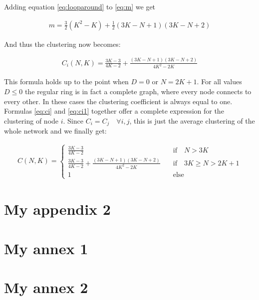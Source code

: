 \begin{apendicesenv}
Adding equation \ref{eq:looparound} to \ref{eq:m} we get

\begin{align}
    m = \frac{3}{2}(K^2 - K) + \frac{1}{2}(3K-N+1)(3K-N+2)
\end{align}

And thus the clustering now becomes:

\begin{align}
    C_i(N,K) = \frac{3K-3}{4K-2} + \frac{(3K-N+1)(3K-N+2)}{4K^2-2K}
    \label{eq:ci1}
\end{align}

This formula holds up to the point when $D=0$ or $N=2K+1$. For all values $D\leq 0$ the regular ring is in fact a complete graph, where
every node connects to every other. In these cases the clustering coefficient is always equal to one.  Formulas \ref{eq:ci} and
\ref{eq:ci1} together offer a complete expression for the clustering of node $i$. Since $C_i=C_j \quad \forall i,j$, this is just the
average clustering of the whole network and we finally get:

\begin{align}
    C(N,K) =
    \begin{cases}
        \frac{3K-3}{4K-2} \quad &\text{if} \quad N>3K \\[9pt]
        \frac{3K-3}{4K-2} + \frac{(3K-N+1)(3K-N+2)}{4K^2-2K} \quad &\text{if}
        \quad 3K \geq N > 2K+1 \\[9pt]
        1 \quad &\text{else}
    \end{cases}
    \label{eq:ci2}
\end{align}


\chapter{My appendix 2}


\end{apendicesenv}


\begin{anexosenv}


\partanexos  %

\chapter{My annex 1}
\chapter{My annex 2}


\end{anexosenv}

